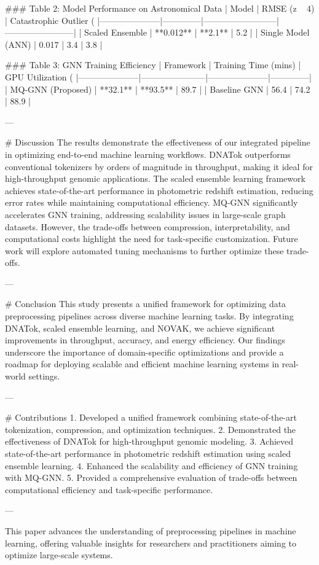 ### Table 2: Model Performance on Astronomical Data  
| Model               | RMSE (z ~ 4) | Catastrophic Outlier (%
|---------------------|--------------|--------------------------|------------------------|  
| Scaled Ensemble     | **0.012**    | **2.1**                  | 5.2                    |  
| Single Model (ANN)  | 0.017        | 3.4                      | 3.8                    |  

### Table 3: GNN Training Efficiency  
| Framework           | Training Time (mins) | GPU Utilization (%
|---------------------|-----------------------|---------------------|--------------|  
| MQ-GNN (Proposed)   | **32.1**             | **93.5**            | 89.7         |  
| Baseline GNN        | 56.4                 | 74.2                | 88.9         |  

---

# Discussion  
The results demonstrate the effectiveness of our integrated pipeline in optimizing end-to-end machine learning workflows. DNATok outperforms conventional tokenizers by orders of magnitude in throughput, making it ideal for high-throughput genomic applications. The scaled ensemble learning framework achieves state-of-the-art performance in photometric redshift estimation, reducing error rates while maintaining computational efficiency. MQ-GNN significantly accelerates GNN training, addressing scalability issues in large-scale graph datasets. However, the trade-offs between compression, interpretability, and computational costs highlight the need for task-specific customization. Future work will explore automated tuning mechanisms to further optimize these trade-offs.

---

# Conclusion  
This study presents a unified framework for optimizing data preprocessing pipelines across diverse machine learning tasks. By integrating DNATok, scaled ensemble learning, and NOVAK, we achieve significant improvements in throughput, accuracy, and energy efficiency. Our findings underscore the importance of domain-specific optimizations and provide a roadmap for deploying scalable and efficient machine learning systems in real-world settings.  

---

# Contributions  
1. Developed a unified framework combining state-of-the-art tokenization, compression, and optimization techniques.  
2. Demonstrated the effectiveness of DNATok for high-throughput genomic modeling.  
3. Achieved state-of-the-art performance in photometric redshift estimation using scaled ensemble learning.  
4. Enhanced the scalability and efficiency of GNN training with MQ-GNN.  
5. Provided a comprehensive evaluation of trade-offs between computational efficiency and task-specific performance.  

--- 

This paper advances the understanding of preprocessing pipelines in machine learning, offering valuable insights for researchers and practitioners aiming to optimize large-scale systems.